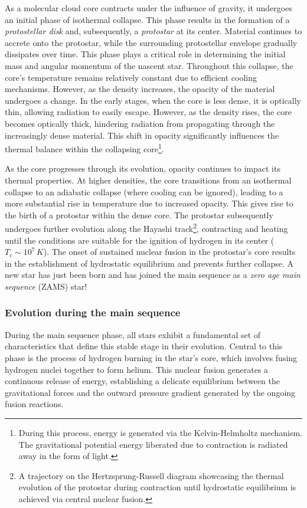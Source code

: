\documentclass[main.tex]{subfiles}
\begin{document}
    As a molecular cloud core contracts under the influence of gravity, it undergoes an initial phase of isothermal collapse. This phase results in the formation of a \textit{protostellar disk} and, subsequently, a \textit{protostar} at its center. Material continues to accrete onto the protostar, while the surrounding protostellar envelope gradually dissipates over time. This phase plays a critical role in determining the initial mass and angular momentum of the nascent star.
    Throughout this collapse, the core's temperature remains relatively constant due to efficient cooling mechanisms. However, as the density increases, the opacity of the material undergoes a change. In the early stages, when the core is less dense, it is optically thin, allowing radiation to easily escape. However, as the density rises, the core becomes optically thick, hindering radiation from propagating through the increasingly dense material. This shift in opacity significantly influences the thermal balance within the collapsing core\footnote{During this process, energy is generated via the Kelvin-Helmholtz mechanism. The gravitational potential energy liberated due to contraction is radiated away in the form of light.}.
    
    As the core progresses through its evolution, opacity continues to impact its thermal properties. At higher densities, the core transitions from an isothermal collapse to an adiabatic collapse (where cooling can be ignored), leading to a more substantial rise in temperature due to increased opacity. This gives rise to the birth of a protostar within the dense core. The protostar subsequently undergoes further evolution along the Hayashi track\footnote{A trajectory on the Hertzsprung-Russell diagram showcasing the thermal evolution of the protostar during contraction until hydrostatic equilibrium is achieved via central nuclear fusion.}, contracting and heating until the conditions are suitable for the ignition of hydrogen in its center ($T_c \sim 10^7\,\text{}K$). The onset of sustained nuclear fusion in the protostar's core results in the establishment of hydrostatic equilibrium and prevents further collapse. A new star has just been born and has joined the main sequence as a \textit{zero age main sequence} (ZAMS) star!
    

    \subsubsection{Evolution during the main sequence}
    During the main sequence phase, all stars exhibit a fundamental set of characteristics that define this stable stage in their evolution. Central to this phase is the process of hydrogen burning in the star's core, which involves fusing hydrogen nuclei together to form helium. This nuclear fusion generates a continuous release of energy, establishing a delicate equilibrium between the gravitational forces 
    and the outward pressure gradient generated by the ongoing fusion reactions.
\end{document}
